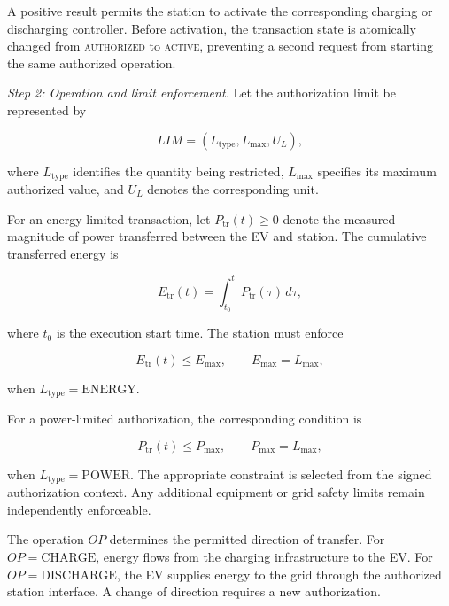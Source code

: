 \documentclass[twocolumn,10pt,journal]{IEEEtran}
\begin{document}
A positive result permits the station to
activate the corresponding charging or
discharging controller. Before activation,
the transaction state is atomically changed
from \textsc{authorized} to \textsc{active},
preventing a second request from starting
the same authorized operation.

\textit{Step 2: Operation and limit enforcement.}
Let the authorization limit be represented by

\begin{equation}
LIM=(L_{\mathrm{type}},L_{\max},U_L),
\label{eq:qsv2g_execution_limit}
\end{equation}

where $L_{\mathrm{type}}$ identifies the
quantity being restricted, $L_{\max}$
specifies its maximum authorized value,
and $U_L$ denotes the corresponding unit.

For an energy-limited transaction, let
$P_{\mathrm{tr}}(t)\geq 0$ denote the
measured magnitude of power transferred
between the EV and station. The cumulative
transferred energy is

\begin{equation}
E_{\mathrm{tr}}(t)
=
\int_{t_0}^{t}
P_{\mathrm{tr}}(\tau)\,d\tau,
\label{eq:qsv2g_transferred_energy}
\end{equation}

where $t_0$ is the execution start time.
The station must enforce

\begin{equation}
E_{\mathrm{tr}}(t)\leq E_{\max},
\qquad
E_{\max}=L_{\max},
\label{eq:qsv2g_energy_constraint}
\end{equation}

when $L_{\mathrm{type}}=\mathrm{ENERGY}$.

For a power-limited authorization,
the corresponding condition is

\begin{equation}
P_{\mathrm{tr}}(t)\leq P_{\max},
\qquad
P_{\max}=L_{\max},
\label{eq:qsv2g_power_constraint}
\end{equation}

when $L_{\mathrm{type}}=\mathrm{POWER}$.
The appropriate constraint is selected
from the signed authorization context.
Any additional equipment or grid safety
limits remain independently enforceable.

The operation $OP$ determines the permitted
direction of transfer. For
$OP=\mathrm{CHARGE}$, energy flows from
the charging infrastructure to the EV.
For $OP=\mathrm{DISCHARGE}$, the EV
supplies energy to the grid through the
authorized station interface. A change
of direction requires a new authorization.
\end{document}
